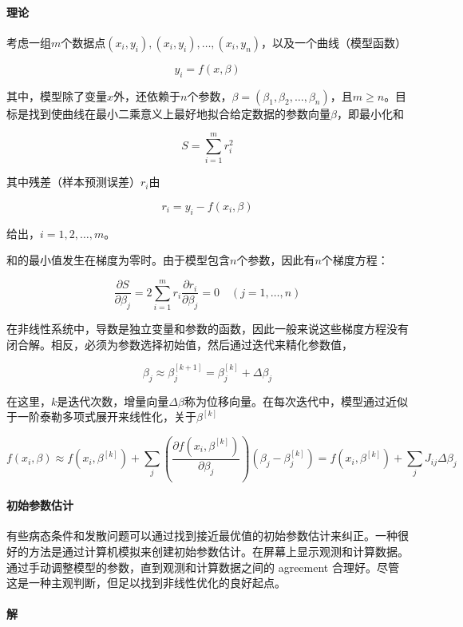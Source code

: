 \documentclass{ctexart}
\begin{document}
\paragraph{理论}

考虑一组$m$个数据点$(x_i, y_i), (x_i, y_i), \ldots, (x_i, y_n)$，以及一个曲线（模型函数）

\[ y_i = f(x, \beta) \]

其中，模型除了变量$x$外，还依赖于$n$个参数，$\beta = (\beta_1, \beta_2, \ldots, \beta_n)$，且$m \geq n$。目标是找到使曲线在最小二乘意义上最好地拟合给定数据的参数向量$\beta$，即最小化和

\[ S = \sum_{i=1}^m r_i^2 \]

其中残差（样本预测误差）$r_i$由

\[ r_i = y_i - f(x_i, \beta) \]

给出，$i = 1, 2, \ldots, m$。

和的最小值发生在梯度为零时。由于模型包含$n$个参数，因此有$n$个梯度方程：

\[ \frac{\partial S}{\partial \beta_j} = 2 \sum_{i=1}^m r_i \frac{\partial r_i}{\partial \beta_j} = 0 \quad (j = 1, \ldots, n) \]

在非线性系统中，导数是独立变量和参数的函数，因此一般来说这些梯度方程没有闭合解。相反，必须为参数选择初始值，然后通过迭代来精化参数值，

\[ \beta_j \approx \beta_j^{[k+1]} = \beta_j^{[k]} + \Delta \beta_j \]

在这里，$k$是迭代次数，增量向量$\Delta \beta$称为位移向量。在每次迭代中，模型通过近似于一阶泰勒多项式展开来线性化，关于$\beta^{[k]}$

\[ f(x_i, \beta) \approx f(x_i, \beta^{[k]}) + \sum_j \left( \frac{\partial f(x_i, \beta^{[k]})}{\partial \beta_j} \right) (\beta_j - \beta_j^{[k]}) = f(x_i, \beta^{[k]}) + \sum_j J_{ij} \Delta \beta_j \]

\paragraph{初始参数估计}

有些病态条件和发散问题可以通过找到接近最优值的初始参数估计来纠正。一种很好的方法是通过计算机模拟来创建初始参数估计。在屏幕上显示观测和计算数据。通过手动调整模型的参数，直到观测和计算数据之间的 agreement 合理好。尽管这是一种主观判断，但足以找到非线性优化的良好起点。

\paragraph{解}
\end{document}
